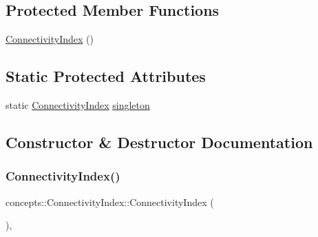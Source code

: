 \subsection*{Protected Member Functions}
\begin{DoxyCompactItemize}
\item 
\hyperlink{classconcepts_1_1_connectivity_index_a6c6bf75148055bdafb48c3d990b10968}{Connectivity\+Index} ()
\end{DoxyCompactItemize}
\subsection*{Static Protected Attributes}
\begin{DoxyCompactItemize}
\item 
static \hyperlink{classconcepts_1_1_connectivity_index}{Connectivity\+Index} \hyperlink{classconcepts_1_1_connectivity_index_a6c3d718aa3d0a00d648560ea0ef89eb4}{singleton}
\end{DoxyCompactItemize}


\subsection{Constructor \& Destructor Documentation}
\mbox{\label{classconcepts_1_1_connectivity_index_a6c6bf75148055bdafb48c3d990b10968}} 
\subsubsection{\texorpdfstring{Connectivity\+Index()}{ConnectivityIndex()}}
{\footnotesize\ttfamily concepts\+::\+Connectivity\+Index\+::\+Connectivity\+Index (\begin{DoxyParamCaption}{ }\end{DoxyParamCaption})\hspace{0.3cm}{\ttfamily [inline]}, {\ttfamily [protected]}}

\mbox{\label{classconcepts_1_1_connectivity_index_aa0ca6c18e8caeb3bc8882e7ce4fc0588}} 
